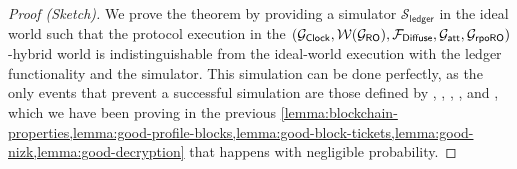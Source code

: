\begin{proof}[Proof (Sketch)]
	We prove the theorem by providing a simulator $\mathcal{S}_{\mathsf{ledger}}$ in the ideal world such that the protocol execution in the  $(\mathcal{G}_{\mathsf{Clock}},\allowbreak \mathcal{W}(\mathcal{G}_{\mathsf{RO}}),\allowbreak \mathcal{F}_{\mathsf{Diffuse}},\allowbreak \mathcal{G}_{\mathsf{att}},\allowbreak \mathcal{G}_{\mathsf{rpoRO}})$-hybrid world is indistinguishable from the ideal-world execution with the ledger functionality and the simulator.
	This simulation can be done perfectly, as the only events that prevent a successful simulation are those defined by \badCP, \badCQ, \badCG, \badProfile, \badNIZK and \badDec, which we have been proving in the previous \cref{lemma:blockchain-properties,lemma:good-profile-blocks,lemma:good-block-tickets,lemma:good-nizk,lemma:good-decryption} that happens with negligible probability.
\end{proof}
